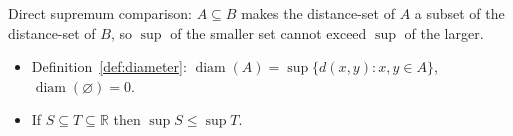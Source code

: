 \begin{remark*}
Direct supremum comparison: $A \subseteq B$ makes the distance-set of $A$
a subset of the distance-set of $B$, so $\sup$ of the smaller set
cannot exceed $\sup$ of the larger.
\end{remark*}

\begin{remark*}[Dependencies]
\begin{itemize}
  \item Definition~\ref{def:diameter}: $\operatorname{diam}(A) = \sup\{d(x,y) : x,y \in A\}$,
        $\operatorname{diam}(\varnothing) = 0$.
  \item If $S \subseteq T \subseteq \mathbb{R}$ then $\sup S \le \sup T$.
\end{itemize}
\end{remark*}
